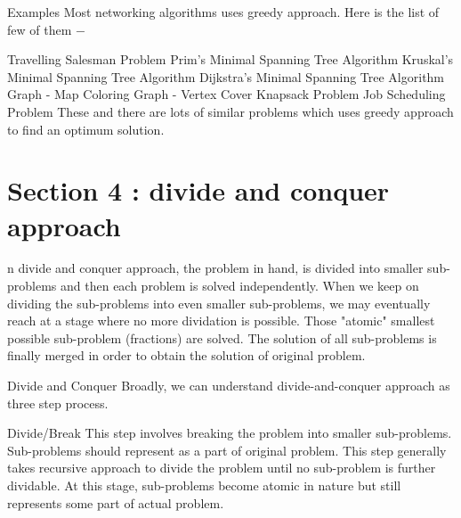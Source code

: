 \documentclass{beamer}
\begin{document}
\begin{frame}
Examples
Most networking algorithms uses greedy approach. Here is the list of few of them −

Travelling Salesman Problem
Prim's Minimal Spanning Tree Algorithm
Kruskal's Minimal Spanning Tree Algorithm
Dijkstra's Minimal Spanning Tree Algorithm
Graph - Map Coloring
Graph - Vertex Cover
Knapsack Problem
Job Scheduling Problem
These and there are lots of similar problems which uses greedy approach to find an optimum solution.

\end{frame}
\section{Section 4 : divide and conquer approach}
\begin{frame}
n divide and conquer approach, the problem in hand, is divided into smaller sub-problems and then each problem is solved independently. When we keep on dividing the sub-problems into even smaller sub-problems, we may eventually reach at a stage where no more dividation is possible. Those "atomic" smallest possible sub-problem (fractions) are solved. The solution of all sub-problems is finally merged in order to obtain the solution of original problem.
\end{frame}
\begin{frame}
Divide and Conquer
Broadly, we can understand divide-and-conquer approach as three step process.

Divide/Break
This step involves breaking the problem into smaller sub-problems. Sub-problems should represent as a part of original problem. This step generally takes recursive approach to divide the problem until no sub-problem is further dividable. At this stage, sub-problems become atomic in nature but still represents some part of actual problem.
\end{frame}
\end{document}
